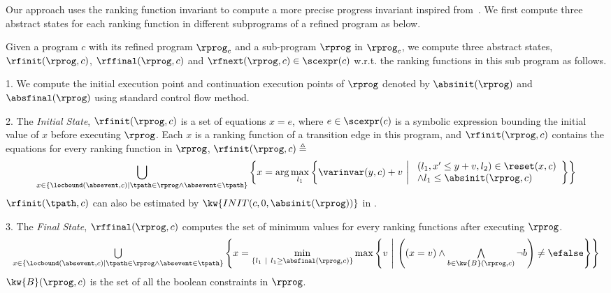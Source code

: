 Our approach uses the ranking function invariant to compute a more precise progress invariant inspired from~\cite{GulwaniJK09}.
We first compute three abstract states for each ranking function in different subprograms of a refined program as below.
\begin{defn}
 \label{def:alg-absstate}
 Given a program $c$ with its refined program $\rprog_c$ and a sub-program $\rprog$ in $\rprog_c$,
 we compute three abstract states, $\rfinit(\rprog, c)$, $\rffinal(\rprog, c)$ and $\rfnext(\rprog, c) \in \scexpr(c)$ w.r.t. the ranking functions in this sub program as follows.
 
 1. We compute the initial execution point and continuation execution points of $\rprog$ denoted by
 $\absinit(\rprog)$
 and 
 $\absfinal(\rprog)$ using standard control flow method.
 
2. The \emph{Initial State}, 
 $\rfinit(\rprog, c)$ is a set of equations $x = e$, where $e \in \scexpr(c)$ is a
 symbolic expression bounding the initial value of $x$ before executing $\rprog$.
 Each $x$ is a ranking function of a transition edge in this program, and $\rfinit(\rprog, c)$ contains the equations for every ranking function in $\rprog$,
 $\rfinit(\rprog, c) \triangleq $
 {\small
 \[
 \bigcup_{x \in \left\{ \locbound(\absevent, c) | \tpath \in \rprog \land \absevent \in \tpath \right\} }
 \left \{ 
 x = \arg\max_{l_1}\left\{
 \varinvar(y, c) + v ~\middle\vert~ 
 \begin{array}{l} 
 (l_1, x' \leq y + v, l_2) \in \reset(x, c) 
 \\
 \land l_1 \leq \absinit(\rprog, c)
 \end{array}
 \right\}
 \right\}
 \]
 }
 $\rfinit(\tpath, c)$ can also be estimated by $\kw{INIT(c, 0, \absinit(\rprog))}$ in \cite{GulwaniJK09}. 

 3. The \emph{Final State}, $\rffinal(\rprog, c)$ computes the set of minimum values for every ranking functions
 after executing $\rprog$.
 {\small
\[
 \begin{array}{l} 
 \bigcup\limits_{x \in \left\{ \locbound(\absevent, c) | \tpath \in \rprog \land \absevent \in \tpath \right\} }
 \left \{ 
 x = \min\limits_{ \left\{ l_1 ~|~ l_1 \geq \absfinal(\rprog, c) \right\} }
 \max\left\{
 v ~\middle\vert~ 
 \left( (x = v) \land \bigwedge\limits_{b \in \kw{B}(\rprog, c)} \neg b \right) \neq \efalse
 \right\}
 \right\}
 \end{array}
 \]
 }
 $\kw{B}(\rprog, c)$ is the set of all the boolean constraints in $\rprog$.


\end{defn}
